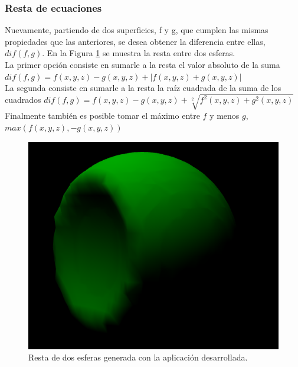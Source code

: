 \documentclass[12pt]{article}
\begin{document}
\subsubsection{Resta de ecuaciones}
Nuevamente, partiendo de dos superficies, f y g, que cumplen las mismas propiedades que las anteriores, se desea obtener la diferencia entre ellas, $dif(f,g)$. En la Figura \ref{resta} se muestra la resta entre dos esferas.
\\La primer opción consiste en sumarle a la resta el valor absoluto de la suma $dif(f,g) = f(x,y,z) - g(x,y,z) + |f(x,y,z) + g(x,y,z)|$
\\La segunda consiste en sumarle a la resta la raíz cuadrada de la suma de los cuadrados $dif(f,g) = f(x,y,z) - g(x,y,z) + \sqrt[2]{f^2(x,y,z) + g^2(x,y,z)}$ 
\\Finalmente también es posible tomar el máximo entre $f$ y menos $g$, $max(f(x,y,z),-g(x,y,z))$
\begin{figure}[h]
\includegraphics[width=0.7\linewidth,center]{oi3.png}
\caption{Resta de dos esferas generada con la aplicación desarrollada.}
\label{resta}
\end{figure}
\end{document}
